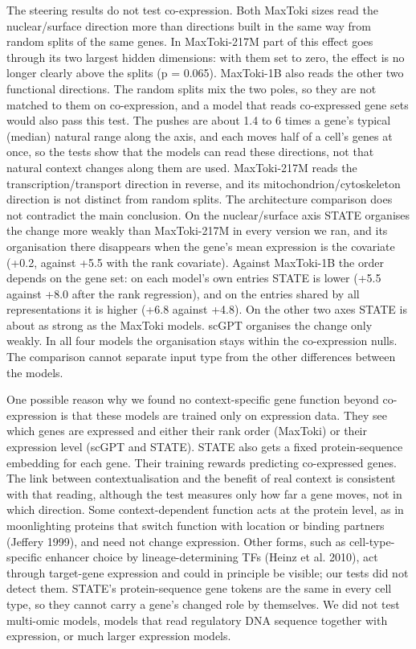 \documentclass[
  11pt,
]{article}
\begin{document}
The steering results do not test co-expression. Both MaxToki sizes read
the nuclear/surface direction more than directions built in the same way
from random splits of the same genes. In MaxToki-217M part of this
effect goes through its two largest hidden dimensions: with them set to
zero, the effect is no longer clearly above the splits (p = 0.065).
MaxToki-1B also reads the other two functional directions. The random
splits mix the two poles, so they are not matched to them on
co-expression, and a model that reads co-expressed gene sets would also
pass this test. The pushes are about 1.4 to 6 times a gene's typical
(median) natural range along the axis, and each moves half of a cell's
genes at once, so the tests show that the models can read these
directions, not that natural context changes along them are used.
MaxToki-217M reads the transcription/transport direction in reverse, and
its mitochondrion/cytoskeleton direction is not distinct from random
splits. The architecture comparison does not contradict the main
conclusion. On the nuclear/surface axis STATE organises the change more
weakly than MaxToki-217M in every version we ran, and its organisation
there disappears when the gene's mean expression is the covariate (+0.2,
against +5.5 with the rank covariate). Against MaxToki-1B the order
depends on the gene set: on each model's own entries STATE is lower
(+5.5 against +8.0 after the rank regression), and on the entries shared
by all representations it is higher (+6.8 against +4.8). On the other
two axes STATE is about as strong as the MaxToki models. scGPT organises
the change only weakly. In all four models the organisation stays within
the co-expression nulls. The comparison cannot separate input type from
the other differences between the models.

One possible reason why we found no context-specific gene function
beyond co-expression is that these models are trained only on expression
data. They see which genes are expressed and either their rank order
(MaxToki) or their expression level (scGPT and STATE). STATE also gets a
fixed protein-sequence embedding for each gene. Their training rewards
predicting co-expressed genes. The link between contextualisation and
the benefit of real context is consistent with that reading, although
the test measures only how far a gene moves, not in which direction.
Some context-dependent function acts at the protein level, as in
moonlighting proteins that switch function with location or binding
partners (Jeffery 1999), and need not change expression. Other forms,
such as cell-type-specific enhancer choice by lineage-determining TFs
(Heinz et al. 2010), act through target-gene expression and could in
principle be visible; our tests did not detect them. STATE's
protein-sequence gene tokens are the same in every cell type, so they
cannot carry a gene's changed role by themselves. We did not test
multi-omic models, models that read regulatory DNA sequence together
with expression, or much larger expression models.
\end{document}
